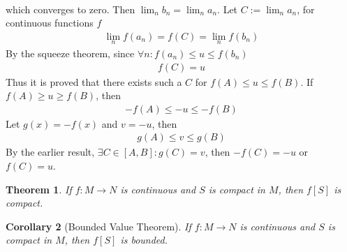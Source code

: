 \documentclass{amsart}
\numberwithin{equation}{section}
\let\oldendproof\endproof
\renewenvironment{proof}[1][\proofname]{%
  \setcounter{case}{0}
  \setcounter{step}{0}
  \oldproof[#1]%
}{\oldendproof}
\theoremstyle{plain}
\newtheorem{theorem}{Theorem}[section]
\newtheorem{corollary}[theorem]{Corollary}
\theoremstyle{definition}
\theoremstyle{remark}
\begin{document}
\begin{proof}
\begin{align}
  \end{align}
  which converges to zero. 
  Then $\lim_n b_n = \lim_n a_n$. Let $C:=\lim_n a_n$, for continuous functions $f$
  \begin{align}
    \lim_n f(a_n) = f(C) = \lim_n f(b_n)
  \end{align}
  By the squeeze theorem, since $\forall n: f(a_n) \leq u \leq f(b_n)$
  \begin{align}
    f(C) = u
  \end{align}
  Thus it is proved that there exists such a $C$ for $f(A) \leq u \leq f(B)$.
  If $f(A) \geq u \geq f(B)$, then 
  \begin{align}
    - f(A) \leq - u \leq -f(B)
  \end{align}
  Let $g(x) = -f(x)$ and $v= -u$, then
  \begin{align}
    g(A) \leq v \leq g(B)
  \end{align}
  By the earlier result, $\exists C\in [A,B]: g(C) = v$, then $-f(C) = -u$ or $f(C) = u$.
\end{proof}

\begin{theorem}
  If $f:M \to N$ is continuous and $S$ is compact in $M$, then $f[S]$ is compact.
\end{theorem}

\begin{corollary}[Bounded Value Theorem]
  If $f:M \to N$ is continuous and $S$ is compact in $M$, then $f[S]$ is bounded.
\end{corollary}
\end{document}
